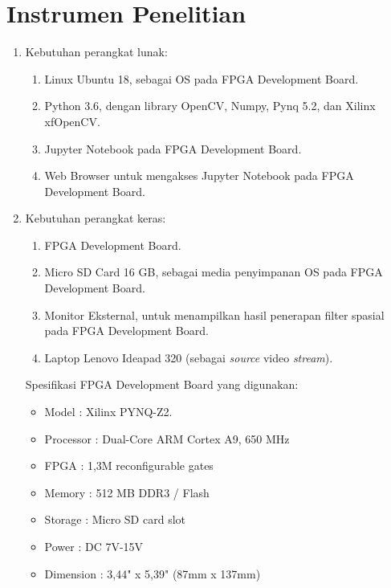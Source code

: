 \pagebreak

\section{Instrumen Penelitian}
\begin{enumerate}[topsep=0pt,itemsep=0pt,partopsep=0pt, parsep=0pt]
    \item Kebutuhan perangkat lunak:
    \begin{enumerate}[topsep=0pt,itemsep=0pt,partopsep=0pt, parsep=0pt, label={\alph*.}]
        \item Linux Ubuntu 18, sebagai OS pada FPGA Development Board.
        \item Python 3.6, dengan library OpenCV, Numpy, Pynq 5.2, dan Xilinx xfOpenCV.
        \item Jupyter Notebook pada FPGA Development Board. 
        \item Web Browser untuk mengakses Jupyter Notebook pada FPGA Development Board.
    \end{enumerate}
    \item Kebutuhan perangkat keras:
    \begin{enumerate}[topsep=0pt,itemsep=0pt,partopsep=0pt, parsep=0pt, label={\alph*.}]
        \item FPGA Development Board.
        \item Micro SD Card 16 GB, sebagai media penyimpanan OS pada FPGA Development Board.
        \item Monitor Eksternal, untuk menampilkan hasil penerapan filter spasial pada FPGA Development Board.
        \item Laptop Lenovo Ideapad 320 (sebagai \textit{source} video \textit{stream}).
    \end{enumerate}

    Spesifikasi FPGA Development Board yang digunakan:
    \begin{itemize}[topsep=0pt,itemsep=0pt,partopsep=0pt, parsep=0pt]
        \item Model : Xilinx PYNQ-Z2.
        \item Processor : Dual-Core ARM Cortex A9, 650 MHz
        \item FPGA : 1,3M reconfigurable gates
        \item Memory : 512 MB DDR3 / Flash
        \item Storage : Micro SD card slot
        \item Power : DC 7V-15V
        \item Dimension : 3,44" x 5,39" (87mm x 137mm)
    \end{itemize}
\end{enumerate}
